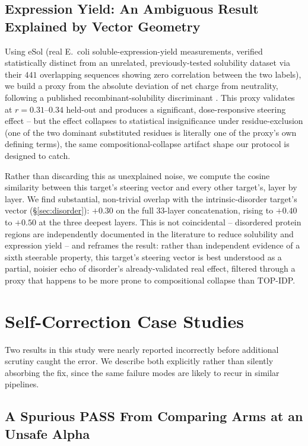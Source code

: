 \documentclass{article}
\begin{document}
\subsection{Expression Yield: An Ambiguous Result Explained by
  Vector Geometry}
\label{sec:expression}

Using eSol (real E.\ coli soluble-expression-yield measurements, verified
statistically distinct from an unrelated, previously-tested solubility
dataset via their $441$ overlapping sequences showing zero correlation
between the two labels), we build a proxy from the absolute deviation of
net charge from neutrality, following a published recombinant-solubility
discriminant \citep{wilkinson1991solubility}. This proxy validates at
$r=0.31$--$0.34$ held-out and produces a significant, dose-responsive
steering effect -- but the effect collapses to statistical
insignificance under residue-exclusion (one of the two dominant
substituted residues is literally one of the proxy's own defining
terms), the same compositional-collapse artifact shape our protocol is
designed to catch.

Rather than discarding this as unexplained noise, we compute the cosine
similarity between this target's steering vector and every other
target's, layer by layer. We find substantial, non-trivial overlap with
the intrinsic-disorder target's vector (\S\ref{sec:disorder}): $+0.30$
on the full 33-layer concatenation, rising to $+0.40$ to $+0.50$ at the
three deepest layers. This is not coincidental -- disordered protein
regions are independently documented in the literature to reduce
solubility and expression yield -- and reframes the result: rather than
independent evidence of a sixth steerable property, this target's
steering vector is best understood as a partial, noisier echo of
disorder's already-validated real effect, filtered through a proxy that
happens to be more prone to compositional collapse than TOP-IDP.

\section{Self-Correction Case Studies}

Two results in this study were nearly reported incorrectly before
additional scrutiny caught the error. We describe both explicitly rather
than silently absorbing the fix, since the same failure modes are likely
to recur in similar pipelines.

\subsection{A Spurious PASS From Comparing Arms at an Unsafe Alpha}
\label{sec:l52}
\end{document}
